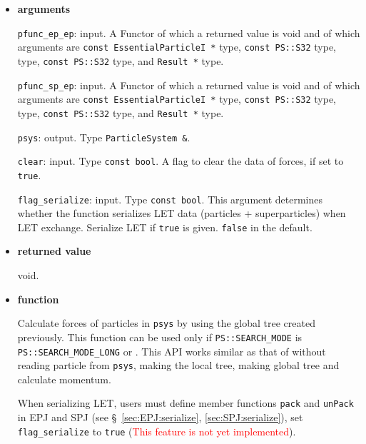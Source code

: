 \begin{itemize}

\item {\bf arguments}

{\tt pfunc\_ep\_ep}: input. A Functor of which a returned value is
void and of which arguments are {\tt const EssentialParticleI *} type, {\tt const PS::S32} type,  type, {\tt const PS::S32} type, and {\tt Result *} type.

{\tt pfunc\_sp\_ep}: input. A Functor of which a returned value is void and of which arguments are {\tt const EssentialParticleI *} type, {\tt const PS::S32} type,  type, {\tt const PS::S32} type, and {\tt Result *} type.

{\tt psys}: output. Type {\tt ParticleSystem \&}.

{\tt clear}: input. Type {\tt const bool}. A flag to clear the data of forces, if set to {\tt true}.

\texttt{flag\_serialize}: input. Type \texttt{const bool}. This argument determines whether the function serializes LET data  (particles + superparticles) when LET exchange. Serialize LET if \texttt{true} is given. \texttt{false} in the default.

\item {\bf returned value}

void.

\item {\bf function}

Calculate forces of particles in {\tt psys} by using the global tree created previously. This function can be used only if {\tt PS::SEARCH\_MODE} is {\tt PS::SEARCH\_MODE\_LONG} or . This API works similar as that of  without reading particle from {\tt psys}, making the local tree, making global tree and calculate momentum.

When serializing LET, users must define member functions \texttt{pack} and \texttt{unPack} in EPJ and SPJ (see \S~\ref{sec:EPJ:serialize}, \ref{sec:SPJ:serialize}), set \texttt{flag\_serialize} to \texttt{true} (\textcolor{red}{This feature is not yet implemented}).

\end{itemize}

